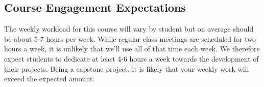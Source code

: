 \documentclass[10pt]{article}
\begin{document}
\subsection{Course Engagement Expectations}

The weekly workload for this course will vary by student but on average should be about 5-7 hours per week.  While regular class meetings are scheduled for two hours a week, it is unlikely that we'll use all of that time each week.  We therefore expect students to dedicate at least 4-6 hours a week towards the development of their projects.  Being a capstone project, it is likely that your weekly work will exceed the expected amount.
\end{document}

